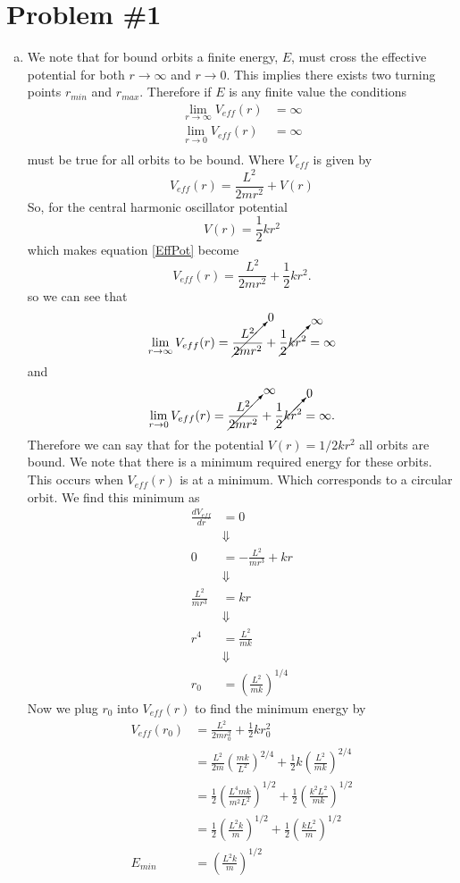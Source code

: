 \documentclass[11pt]{article}
\numberwithin{equation}{section}
\begin{document}



\section{Problem \#1}
\begin{enumerate}[(a)]
\item

We note that for bound orbits a finite energy, $E$, must cross the effective potential
for both $r\rightarrow\infty$ and $r\rightarrow 0$. This implies there exists two 
turning points $r_{min}$ and $r_{max}$. Therefore if $E$ is any finite value the conditions
\begin{align*}
\lim_{r\rightarrow\infty} V_{eff}(r) &= \infty\\ 
\lim_{r\rightarrow 0} V_{eff}(r) &= \infty\\ 
\end{align*}
must be true for all orbits to be bound. Where $V_{eff}$ is given by
\begin{equation}
V_{eff}(r) = \frac{L^2}{2mr^2} + V(r)
\label{EffPot}
\end{equation}
So, for the central harmonic oscillator potential 
$$V(r) = \frac{1}{2}kr^2$$
which makes equation \ref{EffPot} become
$$V_{eff}(r) = \frac{L^2}{2mr^2} + \frac{1}{2}kr^2.$$
so we can see that 
$$\lim_{r\rightarrow\infty}V_{eff}(r) = \cancelto{0}{\frac{L^2}{2mr^2}} + \cancelto{\infty}{\frac{1}{2}kr^2} = \infty$$
and
$$\lim_{r\rightarrow 0}V_{eff}(r) = \cancelto{\infty}{\frac{L^2}{2mr^2}} + \cancelto{0}{\frac{1}{2}kr^2} = \infty.$$
Therefore we can say that for the potential $V(r) = 1/2kr^2$ all orbits are bound. We note
that there is a minimum required energy for these orbits. This occurs when $V_{eff}(r)$ is at
a minimum. Which corresponds to a circular orbit.  We find this minimum as
\begin{align*}
\frac{dV_{eff}}{dr} &= 0\\
&\Downarrow\\
0 &= -\frac{L^2}{mr^3} + kr\\
&\Downarrow\\
\frac{L^2}{mr^3} &= kr\\
&\Downarrow\\
r^4 &= \frac{L^2}{mk}\\
&\Downarrow\\
r_0 &= \left(\frac{L^2}{mk}\right)^{1/4}
\end{align*}
Now we plug $r_0$ into $V_{eff}(r)$ to find the minimum energy by
\begin{align*}
V_{eff}(r_0) &= \frac{L^2}{2mr_0^2} + \frac{1}{2}kr_0^2\\
&= \frac{L^2}{2m}\left(\frac{mk}{L^2}\right)^{2/4} + \frac{1}{2}k\left(\frac{L^2}{mk}\right)^{2/4}\\
&= \frac{1}{2}\left(\frac{L^4mk}{m^2L^2}\right)^{1/2} + \frac{1}{2}\left(\frac{k^2L^2}{mk}\right)^{1/2}\\
&= \frac{1}{2}\left(\frac{L^2k}{m}\right)^{1/2} + \frac{1}{2}\left(\frac{kL^2}{m}\right)^{1/2}\\
E_{min} &= \left(\frac{L^2k}{m}\right)^{1/2}
\end{align*}


\end{enumerate}
\end{document}
